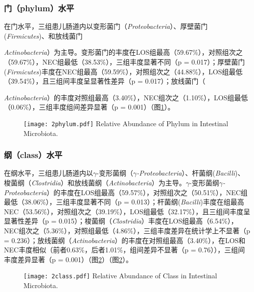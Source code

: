     \subsubsection{门（phylum）水平}
    在门水平，三组患儿肠道内以变形菌门（\textit{Proteobacteria}）、厚壁菌门(\textit{Firmicutes})、和放线菌门{\textit{Actinobacteria}）为主导。变形菌门的丰度在LOS组最高（59.67\%），对照组次之（59.67\%），NEC组最低（38.53\%），三组丰度显著不同（p = 0.017）；厚壁菌门(\textit{Firmicutes})丰度在NEC组最高（59.59\%），对照组次之（44.88\%），LOS组最低（39.54\%），且三组间丰度呈显著性差异（p = 0.017）；放线菌门（{\textit{Actinobacteria}）的丰度对照组最高（3.40\%），NEC组次之（1.10\%），LOS组最低（0.06\%），三组丰度组间差异显著（p = 0.001）（图\ref{fig:2phylum}）。
      \begin{figure}[!htp]
        \centering
        \texttt{[image: 2phylum.pdf]}
          {Relative Abundance of Phylum in Intestinal Microbiota.}
        \label{fig:2phylum}
      \end{figure}

    \subsubsection{纲（class）水平}
    在纲水平，三组患儿肠道内以$\gamma$-变形菌纲（\textit{$\gamma$-Proteobacteria}）、杆菌纲(\textit{Bacilli})、梭菌纲（\textit{Clostridia}）和放线菌纲（\textit{Actinobacteria}）为主导。$\gamma$-变形菌纲\textit{$\gamma$-Proteobacteria}）的丰度在LOS组最高（59.57\%），对照组次之（50.51\%），NEC组最低（38.06\%），三组丰度显著不同（p = 0.013）；杆菌纲(\textit{Bacilli})丰度在组最高NEC（53.56\%），对照组次之（39.19\%），LOS组最低（32.17\%），且三组间丰度呈显著性差异（p = 0.015）；梭菌纲（\textit{Clostridia}）丰度在LOS组最高（6.54\%），NEC组次之（5.36\%），对照组最低（4.86\%），三组丰度差异在统计学上不显著（p = 0.236）；放线菌纲（\textit{Actinobacteria}）的丰度在对照组最高（3.40\%），在LOS和NEC丰度相似（前者0.63\%，后者1.01\%，组间差异不显著（p = 0.76）），三组间丰度差异显著（p = 0.001）（图\ref{fig:2class}）（图\ref{fig:2class}）。
      \begin{figure}[!htp]
        \centering
        \texttt{[image: 2class.pdf]}
          {Relative Abundance of Class in Intestinal Microbiota.}
        \label{fig:2class}
      \end{figure}

}}
